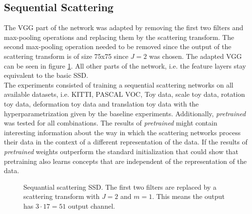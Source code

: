 \subsection{Sequential Scattering}
\label{subsec:sequential_scattering_experiment}

The VGG part of the network was adapted by removing the first two filters and max-pooling operations and replacing them by the scattering transform. The second max-pooling operation needed to be removed since the output of the scattering transform is of size 75x75 since $J=2$ was chosen. The adapted VGG can be seen in figure \ref{fig:sequential_scattering_SSD}. All other parts of the network, i.e. the feature layers stay equivalent to the basic SSD. \\
The experiments consisted of training a sequential scattering networks on all available datasets, i.e. KITTI, PASCAL VOC, Toy data, scale toy data, rotation toy data, deformation toy data and translation toy data with the hyperparametrization given by the baseline experiments. Additionally, \textit{pretrained} was tested for all combinations. The results of \textit{pretrained} might contain interesting information about the way in which the scattering networks process their data in the context of a different representation of the data. If the results of \textit{pretrained} weights outperform the standard initialization that could show that pretraining also learns concepts that are independent of the representation of the data. 

\begin{figure}[!htb]
	\centering
	\caption{Sequantial scattering SSD. The first two filters are replaced by a scattering transform with $J=2$ and $m=1$. This means the output has $3 \cdot 17 =51$ output channel.}
	\label{fig:sequential_scattering_SSD}
\end{figure}

